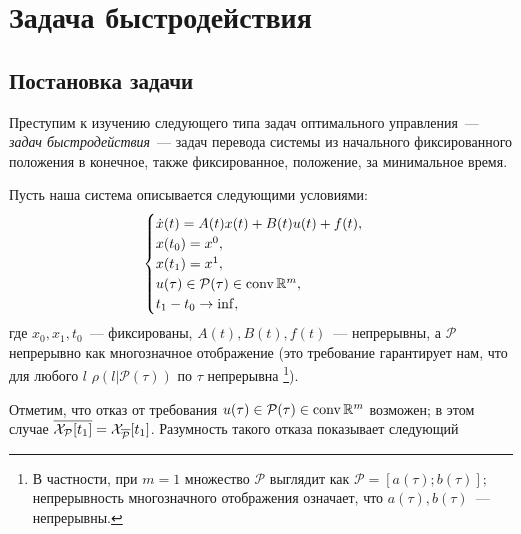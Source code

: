 %
%
%
%

%
%
\section{Задача быстродействия}
\subsection{Постановка задачи}
Преступим к изучению следующего типа задач
оптимального управления~--- \textit{задач быстродействия}~--- задач
перевода системы из начального фиксированного
положения в конечное, также фиксированное,
положение, за минимальное время.

Пусть наша система описывается следующими условиями:
\begin{equation}\label{QT_1}
  \begin{cases}
    \dot{x}(t)= A(t)x(t) + B(t)u(t) + f(t),\\
    x(t_0) = x^0,\\
    x(t_1) = x^1,\\
    u(\tau) \in \mathcal{P}(\tau)\in\operatorname{conv}\mathbb{R}^{m},\\
    t_1 - t_0\to\inf,
  \end{cases}
\end{equation}
где $x_0, x_1, t_0$~--- фиксированы,
$A(t), B(t), f(t)$~--- непрерывны,
а $\mathcal{P}$ непрерывно как многозначное
отображение (это требование гарантирует нам,
что для любого $l$ $\rho(l|\mathcal{P(\tau)})$
по $\tau$ непрерывна
\footnote{В частности, при $m = 1$ множество
$\mathcal{P}$ выглядит как
$\mathcal{P} = [a(\tau); b(\tau)]$;
непрерывность многозначного отображения означает,
что $a(\tau), b(\tau)$~--- непрерывны.}).

Отметим, что отказ от требования
$u(\tau)\in \mathcal{P}(\tau)\in\operatorname{conv}\mathbb{R}^{m}$ возможен;
в этом случае
$\overline{\mathcal{X}_{\mathcal{P}}[t_1]}=\mathcal{X}_{\overline{\mathcal{P}}}[t_1]$.
Разумность такого отказа показывает следующий


